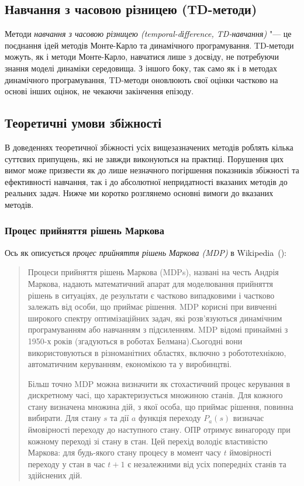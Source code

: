 \documentclass[a4paper,12pt]{article}
\begin{document}
\subsection{Навчання з часовою різницею (TD-методи)}

Методи \emph{навчання з часовою різницею (temporal-dіfference, TD-навчання)} "--- це поєднання ідей методів Монте-Карло та динамічного програмування. TD-методи можуть, як і методи Монте-Карло, навчатися лише з досвіду, не потребуючи знання моделі динаміки середовища. З іншого боку, так само як і в методах динамічного програмування, TD-методи оновлюють свої оцінки частково на основі інших оцінок, не чекаючи закінчення епізоду.

\subsection{Теоретичні умови збіжності}

В доведеннях теоретичної збіжності усіх вищезазначених методів роблять кілька суттєвих припущень, які не завжди виконуються на практиці. Порушення цих вимог може призвести як до лише незначного погіршення показників збіжності та ефективності навчання, так і до абсолютної непридатності вказаних методів до реальних задач. Нижче ми коротко розглянемо основні вимоги до вказаних методів.

\subsubsection{Процес прийняття рішень Маркова}

Ось як описується \emph{процес прийняття рішень Маркова (MDP)} в Wikipedia~(\cite{WikiMDP}):
\begin{quotation}
	Процеси прийняття рішень Маркова (MDPs), названі на честь Андрія Маркова, надають математичний апарат для моделювання прийняття рішень в ситуаціях, де результати є частково випадковими і частково залежать від особи, що приймає рішення. MDP корисні при вивченні широкого спектру оптимізаційних задач, які розв'язуються динамічним програмуванням або навчанням з підсиленням. MDP відомі принаймні з 1950-х років (згадуються в роботах Белмана).Сьогодні вони використовуються в різноманітних областях, включно з робототехнікою, автоматичним керуванням, економікою та у виробинцтві.

	Більш точно MDP можна визначити як стохастичний процес керування в дискретному часі, що характеризується множиною станів. Для кожного стану визначена множина дій, з якої особа, що приймає рішення, повинна вибирати. Для стану $s$ та дії $a$ функція переходу $P_a(s)$ визначає ймовірності переходу до наступного стану. ОПР отримує винагороду при кожному переході зі стану в стан. Цей перехід володіє властивістю Маркова: для будь-якого стану процесу в момент часу $t$ ймовірності переходу у стан в час $t+1$ є незалежними від усіх попередніх станів та здійснених дій.
\end{quotation}
\end{document}
